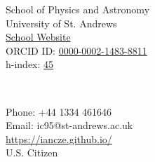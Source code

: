\parbox[t]{3in}{
\begin{flushleft}
School of Physics and Astronomy\\
University of St. Andrews\\
\href{https://www.st-andrews.ac.uk/physics-astronomy/people/ic95/}{School Website} \\
ORCID ID: \href{http://orcid.org/0000-0002-1483-8811}{0000-0002-1483-8811} \\
h-index: \href{https://ui.adsabs.harvard.edu/public-libraries/G0Ow9TGTRyuVT7hbhzailA}{45} \\
\end{flushleft}} \ \hfill  \
\parbox[t]{3in}{
\begin{flushright}
Phone: +44 1334 461646\\
Email: ic95@st-andrews.ac.uk\\
\url{https://iancze.github.io/}\\
U.S. Citizen
\end{flushright}}
